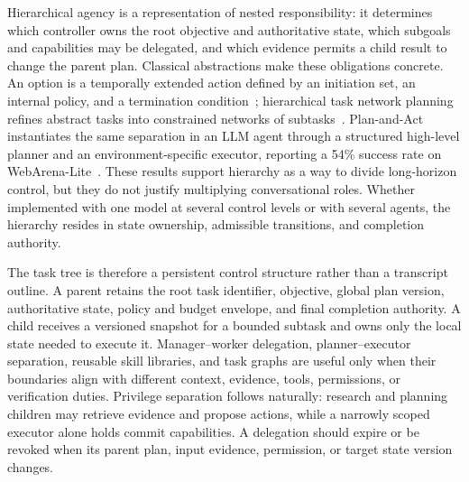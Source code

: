 Hierarchical agency is a representation of nested responsibility: it determines which controller owns the root objective and authoritative state, which subgoals and capabilities may be delegated, and which evidence permits a child result to change the parent plan. Classical abstractions make these obligations concrete. An option is a temporally extended action defined by an initiation set, an internal policy, and a termination condition~\cite{sutton1999options}; hierarchical task network planning refines abstract tasks into constrained networks of subtasks~\cite{erol1994htn}. Plan-and-Act instantiates the same separation in an LLM agent through a structured high-level planner and an environment-specific executor, reporting a 54\% success rate on WebArena-Lite~\cite{erdogan2025planandact}. These results support hierarchy as a way to divide long-horizon control, but they do not justify multiplying conversational roles. Whether implemented with one model at several control levels or with several agents, the hierarchy resides in state ownership, admissible transitions, and completion authority.

The task tree is therefore a persistent control structure rather than a transcript outline. A parent retains the root task identifier, objective, global plan version, authoritative state, policy and budget envelope, and final completion authority. A child receives a versioned snapshot for a bounded subtask and owns only the local state needed to execute it. Manager--worker delegation, planner--executor separation, reusable skill libraries, and task graphs are useful only when their boundaries align with different context, evidence, tools, permissions, or verification duties. Privilege separation follows naturally: research and planning children may retrieve evidence and propose actions, while a narrowly scoped executor alone holds commit capabilities. A delegation should expire or be revoked when its parent plan, input evidence, permission, or target state version changes.

